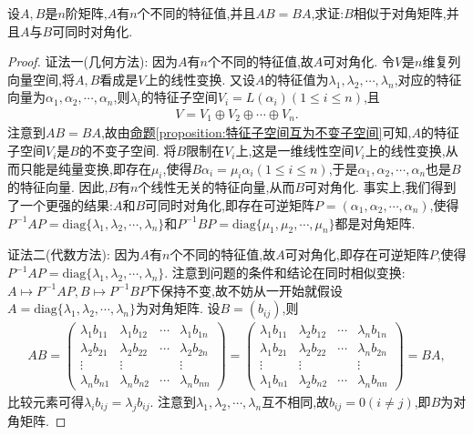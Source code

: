 \documentclass[../../main.tex]{subfiles}%
\begin{document}
\begin{proposition}\label{proposition:可对角化矩阵与其他矩阵乘法可交换诱导可同时对角化}
设$A,B$是$n$阶矩阵,$A$有$n$个不同的特征值,并且$AB = BA$,求证:$B$相似于对角矩阵,并且$A$与$B$可同时对角化.
\end{proposition}
\begin{proof}

{\color{blue}证法一(几何方法):} 因为$A$有$n$个不同的特征值,故$A$可对角化. 令$V$是$n$维复列向量空间,将$A,B$看成是$V$上的线性变换. 又设$A$的特征值为$\lambda_1,\lambda_2,\cdots,\lambda_n$,对应的特征向量为$\alpha_1,\alpha_2,\cdots,\alpha_n$,则$\lambda_i$的特征子空间$V_i = L(\alpha_i)(1 \leqslant  i \leqslant  n)$,且
\begin{align*}
V = V_1 \oplus V_2 \oplus \cdots \oplus V_n.
\end{align*}
注意到$AB = BA$,故由\hyperref[proposition:特征子空间互为不变子空间]{命题\ref{proposition:特征子空间互为不变子空间}}可知,$A$的特征子空间$V_i$是$B$的不变子空间. 将$B$限制在$V_i$上,这是一维线性空间$V_i$上的线性变换,从而只能是纯量变换,即存在$\mu_i$,使得$B\alpha_i = \mu_i\alpha_i(1 \leqslant  i \leqslant  n)$,于是$\alpha_1,\alpha_2,\cdots,\alpha_n$也是$B$的特征向量. 因此,$B$有$n$个线性无关的特征向量,从而$B$可对角化. 事实上,我们得到了一个更强的结果:$A$和$B$可同时对角化,即存在可逆矩阵$P = (\alpha_1,\alpha_2,\cdots,\alpha_n)$,使得$P^{-1}AP = \mathrm{diag}\{\lambda_1,\lambda_2,\cdots,\lambda_n\}$和$P^{-1}BP = \mathrm{diag}\{\mu_1,\mu_2,\cdots,\mu_n\}$都是对角矩阵.

{\color{blue}证法二(代数方法):}
 因为$A$有$n$个不同的特征值,故$A$可对角化,即存在可逆矩阵$P$,使得$P^{-1}AP = \mathrm{diag}\{\lambda_1,\lambda_2,\cdots,\lambda_n\}$. 注意到问题的条件和结论在同时相似变换:$A \mapsto P^{-1}AP,B \mapsto P^{-1}BP$下保持不变,故不妨从一开始就假设$A = \mathrm{diag}\{\lambda_1,\lambda_2,\cdots,\lambda_n\}$为对角矩阵. 设$B = (b_{ij})$,则
\begin{align*}
AB=\begin{pmatrix}
\lambda_1b_{11}&\lambda_1b_{12}&\cdots&\lambda_1b_{1n}\\
\lambda_2b_{21}&\lambda_2b_{22}&\cdots&\lambda_2b_{2n}\\
\vdots&\vdots&&\vdots\\
\lambda_nb_{n1}&\lambda_nb_{n2}&\cdots&\lambda_nb_{nn}
\end{pmatrix}=\begin{pmatrix}
\lambda_1b_{11}&\lambda_2b_{12}&\cdots&\lambda_nb_{1n}\\
\lambda_1b_{21}&\lambda_2b_{22}&\cdots&\lambda_nb_{2n}\\
\vdots&\vdots&&\vdots\\
\lambda_1b_{n1}&\lambda_2b_{n2}&\cdots&\lambda_nb_{nn}
\end{pmatrix}=BA,
\end{align*}
比较元素可得$\lambda_ib_{ij} = \lambda_jb_{ij}$. 注意到$\lambda_1,\lambda_2,\cdots,\lambda_n$互不相同,故$b_{ij} = 0(i \neq j)$,即$B$为对角矩阵.

\end{proof}
\end{document}
